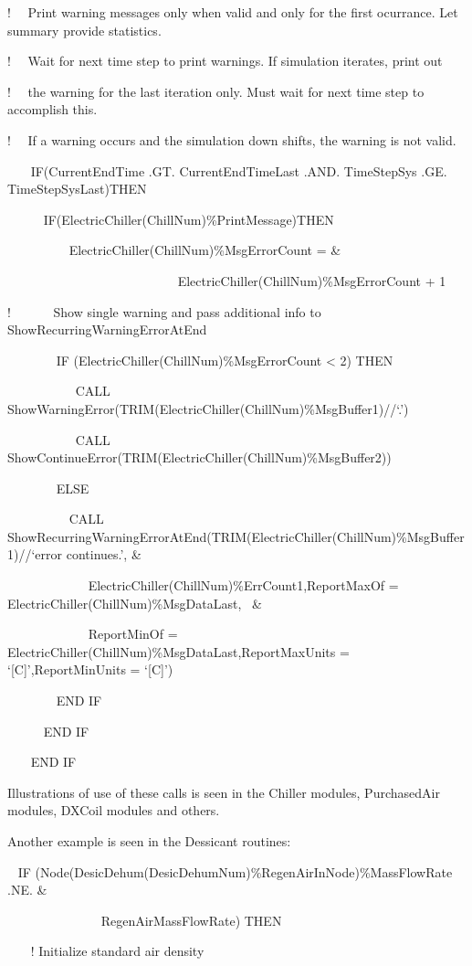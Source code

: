 !~~ Print warning messages only when valid and only for the first ocurrance. Let summary provide statistics.

!~~ Wait for next time step to print warnings. If simulation iterates, print out

!~~ the warning for the last iteration only. Must wait for next time step to accomplish this.

!~~ If a warning occurs and the simulation down shifts, the warning is not valid.

~~~ IF(CurrentEndTime .GT. CurrentEndTimeLast .AND. TimeStepSys .GE. TimeStepSysLast)THEN

~~~~~ IF(ElectricChiller(ChillNum)\%PrintMessage)THEN

~~~~~~~~~ ElectricChiller(ChillNum)\%MsgErrorCount = \&

~~~~~~~~~~~~~~~~~~~~~~~~~~ ElectricChiller(ChillNum)\%MsgErrorCount + 1

!~~~~~~ Show single warning and pass additional info to ShowRecurringWarningErrorAtEnd

~~~~~~~ IF (ElectricChiller(ChillNum)\%MsgErrorCount \textless{} 2) THEN

~~~~~~~~~~ CALL ShowWarningError(TRIM(ElectricChiller(ChillNum)\%MsgBuffer1)//`.')

~~~~~~~~~~ CALL ShowContinueError(TRIM(ElectricChiller(ChillNum)\%MsgBuffer2))

~~~~~~~ ELSE

~~~~~~~~~ CALL ShowRecurringWarningErrorAtEnd(TRIM(ElectricChiller(ChillNum)\%MsgBuffer1)//`error continues.', \&

~~~~~~~~~~~~ ElectricChiller(ChillNum)\%ErrCount1,ReportMaxOf = ElectricChiller(ChillNum)\%MsgDataLast,~ \&

~~~~~~~~~~~~ ReportMinOf = ElectricChiller(ChillNum)\%MsgDataLast,ReportMaxUnits = `{[}C{]}',ReportMinUnits = `{[}C{]}')

~~~~~~~ END IF

~~~~~ END IF

~~~ END IF

Illustrations of use of these calls is seen in the Chiller modules, PurchasedAir modules, DXCoil modules and others.

Another example is seen in the Dessicant routines:

~ IF (Node(DesicDehum(DesicDehumNum)\%RegenAirInNode)\%MassFlowRate .NE. \&

~~~~~~~~~~~~~~ RegenAirMassFlowRate) THEN

~~~ ! Initialize standard air density

